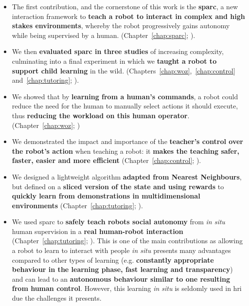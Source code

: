\begin{itemize}
	\item The first contribution, and the cornerstone of this work is the \textbf{\acrfull{sparc}}, a new interaction framework to \textbf{teach a robot to interact in complex and high stakes environments}, whereby the robot progressively gains autonomy while being supervised by a human. (Chapter~\ref{chap:sparc}; \citealt{senft2015human,senft2015sparc}).
	
	\item We then \textbf{evaluated \gls{sparc} in three studies} of increasing complexity, culminating into a final experiment in which we \textbf{taught a robot to support child learning} in the wild. (Chapters~\ref{chap:woz},~\ref{chap:control} and~\ref{chap:tutoring}; \citealt{senft2015sparc,senft2017supervised,senft2018robots}).
	
	\item We showed that by \textbf{learning from a human's commands}, a robot could reduce the need for the human to manually select actions it should execute, thus \textbf{reducing the workload on this human operator}. (Chapter~\ref{chap:woz}; \citealt{senft2015sparc})	
	
	\item We demonstrated the impact and importance of the \textbf{teacher's control over the robot's action} when teaching a robot: it \textbf{makes the teaching safer, faster, easier and more efficient} (Chapter~\ref{chap:control}; \citealt{senft2016sparc,senft2017supervised}).
	
	\item We designed a lightweight algorithm \textbf{adapted from Nearest Neighbours}, but defined on a \textbf{sliced version of the state and using rewards} to \textbf{quickly learn from demonstrations in multidimensional environments} (Chapter~\ref{chap:tutoring}; \citealt{senft2017toward}).
	
	\item We used \gls{sparc} to \textbf{safely teach robots social autonomy}  from \textit{in situ} human supervision in a \textbf{real human-robot interaction} (Chapter~\ref{chap:tutoring}; \citealt{senft2018robots}). This is one of the main contributions as allowing a robot to learn to interact with people \textit{in situ} presents many advantages compared to other types of learning (e.g. \textbf{constantly appropriate behaviour in the learning phase, fast learning and transparency}) and can lead to an \textbf{autonomous behaviour similar to one resulting from human control}. However, this learning \emph{in situ} is seldomly used in \gls{hri} due the challenges it presents.
\end{itemize}

